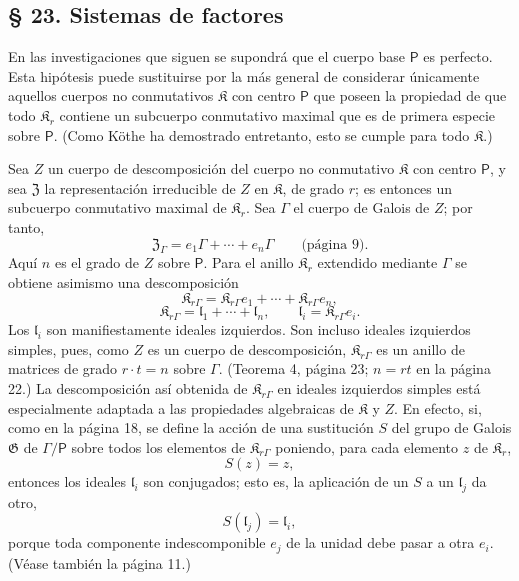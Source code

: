 \subsection*{§ 23. Sistemas de factores}\label{faktorensysteme}

En las investigaciones que siguen se supondrá que el cuerpo base \(\mathsf P\) es perfecto. Esta hipótesis puede sustituirse por la más general de considerar únicamente aquellos cuerpos no conmutativos \(\mathfrak K\) con centro \(\mathsf P\) que poseen la propiedad de que todo \(\mathfrak K_r\) contiene un subcuerpo conmutativo maximal que es de primera especie sobre \(\mathsf P\). (Como Köthe ha demostrado entretanto, esto se cumple para todo \(\mathfrak K\).)

Sea \(Z\) un cuerpo de descomposición del cuerpo no conmutativo \(\mathfrak K\) con centro \(\mathsf P\), y sea \(\mathfrak Z\) la representación irreducible de \(Z\) en \(\mathfrak K\), de grado \(r\); es entonces un subcuerpo conmutativo maximal de \(\mathfrak K_r\). Sea \(\Gamma\) el cuerpo de Galois de \(Z\); por tanto,
\[
\mathfrak Z_\Gamma=e_1\Gamma+\cdots+e_n\Gamma
\qquad\text{(página 9)}.
\]
Aquí \(n\) es el grado de \(Z\) sobre \(\mathsf P\). Para el anillo \(\mathfrak K_r\) extendido mediante \(\Gamma\) se obtiene asimismo una descomposición
\[
\mathfrak K_{r\Gamma}=\mathfrak K_{r\Gamma}e_1+\cdots+\mathfrak K_{r\Gamma}e_n,
\]
\[
\mathfrak K_{r\Gamma}=\mathfrak l_1+\cdots+\mathfrak l_n,
\qquad
\mathfrak l_i=\mathfrak K_{r\Gamma}e_i.
\]
Los \(\mathfrak l_i\) son manifiestamente ideales izquierdos. Son incluso ideales izquierdos simples, pues, como \(Z\) es un cuerpo de descomposición, \(\mathfrak K_{r\Gamma}\) es un anillo de matrices de grado \(r\cdot t=n\) sobre \(\Gamma\). (Teorema 4, página 23; \(n=rt\) en la página 22.) La descomposición así obtenida de \(\mathfrak K_{r\Gamma}\) en ideales izquierdos simples está especialmente adaptada a las propiedades algebraicas de \(\mathfrak K\) y \(Z\). En efecto, si, como en la página 18, se define la acción de una sustitución \(S\) del grupo de Galois \(\mathfrak G\) de \(\Gamma/\mathsf P\) sobre todos los elementos de \(\mathfrak K_{r\Gamma}\) poniendo, para cada elemento \(z\) de \(\mathfrak K_r\),
\[
S(z)=z,
\]
entonces los ideales \(\mathfrak l_i\) son conjugados; esto es, la aplicación de un \(S\) a un \(\mathfrak l_j\) da otro,
\[
S(\mathfrak l_j)=\mathfrak l_i,
\]
porque toda componente indescomponible \(e_j\) de la unidad debe pasar a otra \(e_i\). (Véase también la página 11.)

